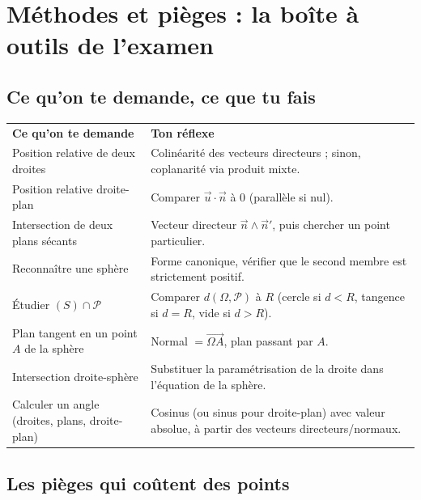 \documentclass[11pt,a4paper]{article}
\begin{document}
\section{Méthodes et pièges : la boîte à outils de l'examen}

\subsection{Ce qu'on te demande, ce que tu fais}

\begin{center}
\renewcommand{\arraystretch}{1.45}
\sffamily\small
\begin{tabular}{>{\raggedright\arraybackslash}p{7.2cm} >{\raggedright\arraybackslash}p{8cm}}
\rowcolor{qtealdark} \color{white}\bfseries Ce qu'on te demande & \color{white}\bfseries Ton réflexe \\
\rowcolor{tealpale} Position relative de deux droites & Colinéarité des vecteurs directeurs ; sinon, coplanarité via produit mixte. \\
Position relative droite-plan & Comparer $\vec u\cdot\vec n$ à $0$ (parallèle si nul). \\
\rowcolor{tealpale} Intersection de deux plans sécants & Vecteur directeur $\vec n\wedge\vec n'$, puis chercher un point particulier. \\
Reconnaître une sphère & Forme canonique, vérifier que le second membre est strictement positif. \\
\rowcolor{tealpale} Étudier $(S)\cap\mathcal{P}$ & Comparer $d(\Omega,\mathcal{P})$ à $R$ (cercle si $d<R$, tangence si $d=R$, vide si $d>R$). \\
Plan tangent en un point $A$ de la sphère & Normal $=\overrightarrow{\Omega A}$, plan passant par $A$. \\
\rowcolor{tealpale} Intersection droite-sphère & Substituer la paramétrisation de la droite dans l'équation de la sphère. \\
Calculer un angle (droites, plans, droite-plan) & Cosinus (ou sinus pour droite-plan) avec valeur absolue, à partir des vecteurs directeurs/normaux. \\
\end{tabular}
\end{center}

\subsection{Les pièges qui coûtent des points}
\end{document}
